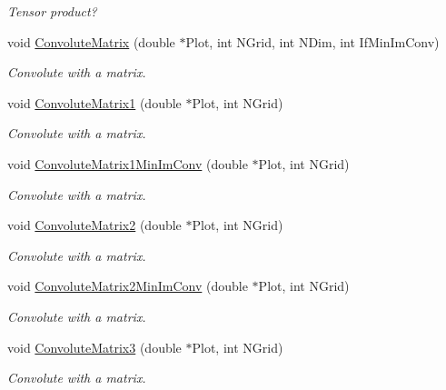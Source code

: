 \begin{DoxyCompactItemize}
\begin{DoxyCompactList}\small\item\em Tensor product? \end{DoxyCompactList}\item 
void \hyperlink{classMatrice_a99c8b7cc887b83243200255862b1491c}{Convolute\+Matrix} (double $\ast$Plot, int N\+Grid, int N\+Dim, int If\+Min\+Im\+Conv)\hypertarget{classMatrice_a99c8b7cc887b83243200255862b1491c}{}\label{classMatrice_a99c8b7cc887b83243200255862b1491c}

\begin{DoxyCompactList}\small\item\em Convolute with a matrix. \end{DoxyCompactList}\item 
void \hyperlink{classMatrice_a529e330488932c6b5e5f68e446d6c78d}{Convolute\+Matrix1} (double $\ast$Plot, int N\+Grid)\hypertarget{classMatrice_a529e330488932c6b5e5f68e446d6c78d}{}\label{classMatrice_a529e330488932c6b5e5f68e446d6c78d}

\begin{DoxyCompactList}\small\item\em Convolute with a matrix. \end{DoxyCompactList}\item 
void \hyperlink{classMatrice_a20a3494fe09c247b756a0de321386af7}{Convolute\+Matrix1\+Min\+Im\+Conv} (double $\ast$Plot, int N\+Grid)\hypertarget{classMatrice_a20a3494fe09c247b756a0de321386af7}{}\label{classMatrice_a20a3494fe09c247b756a0de321386af7}

\begin{DoxyCompactList}\small\item\em Convolute with a matrix. \end{DoxyCompactList}\item 
void \hyperlink{classMatrice_af0c76ea6dc869dc8a9868d200cd8585d}{Convolute\+Matrix2} (double $\ast$Plot, int N\+Grid)
\begin{DoxyCompactList}\small\item\em Convolute with a matrix. \end{DoxyCompactList}\item 
void \hyperlink{classMatrice_abeb003c7b0ee7b24821ee9fedd83ab78}{Convolute\+Matrix2\+Min\+Im\+Conv} (double $\ast$Plot, int N\+Grid)
\begin{DoxyCompactList}\small\item\em Convolute with a matrix. \end{DoxyCompactList}\item 
void \hyperlink{classMatrice_a1bbd091a9143f3e458569b5c0f6d1d4e}{Convolute\+Matrix3} (double $\ast$Plot, int N\+Grid)\hypertarget{classMatrice_a1bbd091a9143f3e458569b5c0f6d1d4e}{}\label{classMatrice_a1bbd091a9143f3e458569b5c0f6d1d4e}

\begin{DoxyCompactList}\small\item\em Convolute with a matrix. \end{DoxyCompactList}\end{DoxyCompactItemize}
